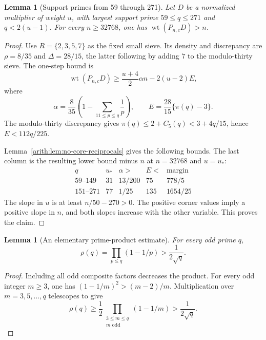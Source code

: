 \documentclass[11pt]{article}
\DeclareMathOperator{\wt}{wt}\DeclareMathOperator{\ord}{ord}
\numberwithin{equation}{section}
\newtheorem{lemma}[theorem]{Lemma}
\theoremstyle{definition}\newtheorem{definition}[theorem]{Definition}
\theoremstyle{remark}\newtheorem{remark}[theorem]{Remark}
\begin{document}
\begin{lemma}[Support primes from 59 through 271]
\label{arith:lem:no-core-middle-primes}
Let $D$ be a normalized multiplier of weight $u$,
with largest support prime $59\le q\le271$ and $q<2(u-1)$.
For every $n\ge32768$, one has $\wt(P_{n,c}D)>n$.
\end{lemma}
\begin{proof}
Use $R=\{2,3,5,7\}$ as the fixed small sieve.  Its density and
discrepancy are $\rho=8/35$ and $\Delta=28/15$, the latter following
by adding $7$ to the modulo-thirty sieve.  The one-step bound is
\[
 \wt(P_{n,c}D)\ge\frac{u+4}{2}\alpha n-2(u-2)E,
\]
where
\[
 \alpha=\frac8{35}\left(1-\sum_{11\le p\le q}\frac1p\right),
 \qquad E=\frac{28}{15}\{\pi(q)-3\}.
\]
The modulo-thirty discrepancy gives
$\pi(q)\le2+C_5(q)<3+4q/15$, hence $E<112q/225$.

Lemma~\ref{arith:lem:no-core-reciprocals} gives the following bounds.
The last column is the resulting lower bound minus $n$ at
$n=32768$ and $u=u_*$:
\[
\begin{array}{c|rrrr}
q&u_*&\alpha>&E<&\text{margin}\\\hline
59\text{--}149&31&13/200&75&778/5\\
151\text{--}271&77&1/25&135&1654/25
\end{array}
\]
The slope in $u$ is at least $n/50-270>0$. The positive corner
values imply a positive slope in $n$, and both slopes increase
with the other variable. This proves the claim.
\end{proof}

\begin{lemma}[An elementary prime-product estimate]
\label{arith:lem:no-core-odd-product}
For every odd prime $q$,
\[
                \rho(q)=\prod_{p\le q}(1-1/p)>\frac1{2\sqrt q}.
\]
\end{lemma}
\begin{proof}
Including all odd composite factors decreases the product.  For every
odd integer $m\ge3$, one has $(1-1/m)^2>(m-2)/m$.  Multiplication
over $m=3,5,\ldots,q$ telescopes to give
\[
 \rho(q)\ge\frac12\prod_{\substack{3\le m\le q\\m\text{ odd}}}
                (1-1/m)>\frac1{2\sqrt q}.
\]
\end{proof}
\end{document}
